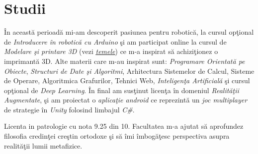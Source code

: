 %


\section{Studii}

{
\idea \^{I}n aceast\u{a} perioad\u{a} mi-am descoperit pasiunea pentru robotic\u{a}, la cursul op\c{t}ional de \emph{Introducere \^{i}n robotic\u{a} cu Arduino} \c{s}i am participat online la cursul de \emph{Modelare \c{s}i printare 3D}
(vezi \href{https://github.com/24Arys11/3D-modeling/tree/main/Homeworks}{\uline{\emph{temele}}})
ce m-a inspirat s\u{a} achizi\c{t}ionez o imprimant\u{a} 3D.
\idea Alte materii care m-au inspirat sunt: \emph{Programare Orientat\u{a} pe Obiecte}, \emph{Structuri de Date \c{s}i Algoritmi}, Arhitectura Sistemelor de Calcul, Sisteme de Operare, Algoritmica Grafurilor, Tehnici Web, \emph{Inteligen\c{t}a Artificial\u{a}} \c{s}i cursul op\c{t}ional de \emph{Deep Learning}.
\idea \^{I}n final am sus\c{t}inut licen\c{t}a \^{i}n domeniul \emph{Realit\u{a}\c{t}ii Augmentate}, \c{s}i am proiectat o \emph{aplica\c{t}ie android} ce reprezint\u{a} un \emph{joc multiplayer} de strategie \^{i}n \emph{Unity} folosind limbajul \emph{C\#}.
}

{
\idea Licenta in patrologie cu nota 9.25 din 10.
\idea Facultatea m-a ajutat s\u{a} aprofundez filosofia credin\c{t}ei cre\c{s}tin ortodoxe \c{s}i s\u{a} \^{i}mi \^{i}mbog\u{a}\c{t}esc perspectiva asupra realit\u{a}\c{t}ii lumii metafizice.
}
